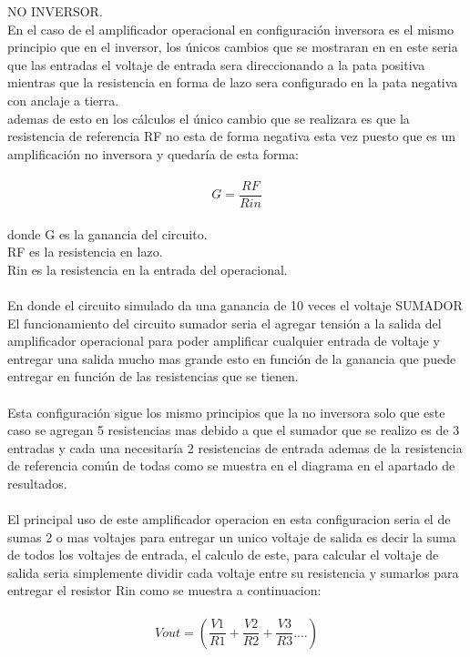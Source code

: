 \documentclass[13pt]{article}
\begin{document}
NO INVERSOR.\\
En el caso de el amplificador operacional en configuración inversora es el mismo principio que en el inversor, los únicos cambios que se mostraran en en este seria que las entradas el voltaje de entrada sera direccionando a la pata positiva mientras que la resistencia en forma de lazo sera configurado en la pata negativa con anclaje a tierra.\\
ademas de esto en los cálculos el único cambio que se realizara es que la resistencia de referencia RF no esta de forma negativa esta vez puesto que es un amplificación no inversora y quedaría de esta forma:\\\\
$$G= \frac{RF}{Rin}$$\\
donde G es la ganancia del circuito.\\
RF es la resistencia en lazo.\\
Rin es la resistencia en la entrada del operacional.\\
\\En donde el circuito simulado da una ganancia de 10 veces el voltaje
SUMADOR\\
El funcionamiento del circuito sumador seria el agregar tensión a la salida del amplificador operacional para poder amplificar cualquier entrada de voltaje y entregar una salida mucho mas grande esto en función de la ganancia que puede entregar en función de las resistencias que se tienen.\\\\
Esta configuración sigue los mismo principios que la no inversora solo que este caso se agregan 5 resistencias mas debido a que el sumador que se realizo es de 3 entradas y cada una necesitaría 2 resistencias de entrada ademas de la resistencia de referencia común de todas como se muestra en el diagrama en el apartado de resultados.\\\\
El principal uso de este amplificador operacion en esta configuracion seria el de sumas 2 o mas voltajes para entregar un unico voltaje de salida es decir la suma de todos los voltajes de entrada, el calculo de este, para calcular el voltaje de salida seria simplemente dividir cada voltaje entre su resistencia y sumarlos para entregar el resistor Rin como se muestra a continuacion:\\\\
$$Vout=(\frac{V1}{R1}+\frac{V2}{R2}+\frac{V3}{R3}....)$$\\\\
\end{document}
